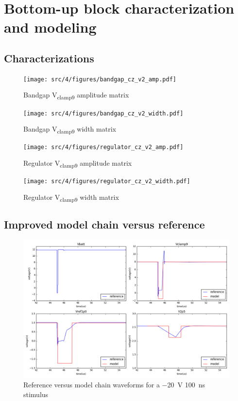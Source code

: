 \chapter{Bottom-up block characterization and modeling}
\section{Characterizations}
\label{apx:block-cz}

\begin{figure}[!h]
  \centering
  \texttt{[image: src/4/figures/bandgap\_cz\_v2\_amp.pdf]}
  \caption{Bandgap V\textsubscript{clamp9} amplitude matrix}
  \label{fig:bg_amp}
\end{figure}

\begin{figure}[!h]
  \centering
  \texttt{[image: src/4/figures/bandgap\_cz\_v2\_width.pdf]}
  \caption{Bandgap V\textsubscript{clamp9} width matrix}
  \label{fig:bg_width}
\end{figure}

\begin{figure}[!h]
  \centering
  \texttt{[image: src/4/figures/regulator\_cz\_v2\_amp.pdf]}
  \caption{Regulator V\textsubscript{clamp9} amplitude matrix}
  \label{fig:regu_amp}
\end{figure}

\begin{figure}[!h]
  \centering
  \texttt{[image: src/4/figures/regulator\_cz\_v2\_width.pdf]}
  \caption{Regulator V\textsubscript{clamp9} width matrix}
  \label{fig:regu_width}
\end{figure}

\section{Improved model chain versus reference}
\label{apx:block-model-comparison}

\begin{figure}[!h]
  \centering
  \includegraphics[width=\textwidth]{src/4/figures/total_simulation_20V_100n_V2.png}
  \caption{Reference versus model chain waveforms for a \SI{-20}{\volt} \SI{100}{\nano\second} stimulus}
  \label{fig:reference_simu_v2_20V_100n}
\end{figure}


